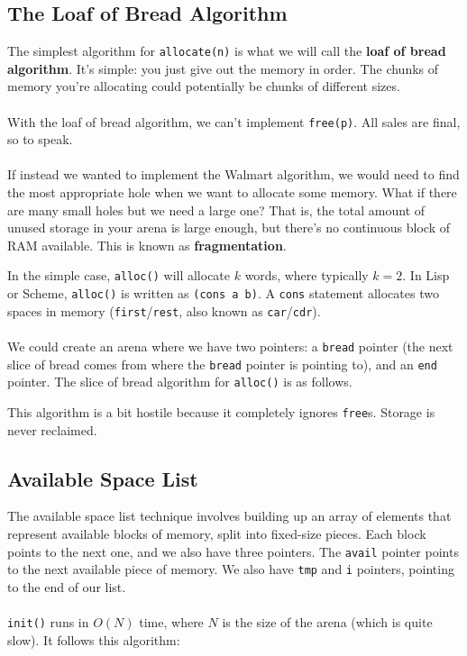 \documentclass[]{article}
\theoremstyle{definition}
\newcommand{\lecture}[1]{\marginpar{{\footnotesize $\leftarrow$ \underline{#1}}}}
\begin{document}
		\subsection{The Loaf of Bread Algorithm}
			The simplest algorithm for \verb+allocate(n)+ is what we will call the \textbf{loaf of bread algorithm}. It's simple: you just give out the memory in order. The chunks of memory you're allocating could potentially be chunks of different sizes.
			\\ \\
			With the loaf of bread algorithm, we can't implement \verb+free(p)+. All sales are final, so to speak.
			\\ \\
			If instead we wanted to implement the Walmart algorithm, we would need to find the most appropriate hole when we want to allocate some memory. What if there are many small holes but we need a large one? That is, the total amount of unused storage in your arena is large enough, but there's no continuous block of RAM available. This is known as \textbf{fragmentation}. \lecture{March 27, 2013}
		
			In the simple case, \verb+alloc()+ will allocate $k$ words, where typically $k = 2$. In Lisp or Scheme, \verb+alloc()+ is written as \verb+(cons a b)+. A \verb+cons+ statement allocates two spaces in memory (\verb+first+/\verb+rest+, also known as \verb+car+/\verb+cdr+).
			\\ \\
			We could create an arena where we have two pointers: a \verb+bread+ pointer (the next slice of bread comes from where the \verb+bread+ pointer is pointing to), and an \verb+end+ pointer. The slice of bread algorithm for \verb+alloc()+ is as follows.

			\begin{algorithm}[H]
			\end{algorithm}

			This algorithm is a bit hostile because it completely ignores \verb+free+s. Storage is never reclaimed.
		
		\subsection{Available Space List}
			The available space list technique involves building up an array of elements that represent available blocks of memory, split into fixed-size pieces. Each block points to the next one, and we also have three pointers. The \verb+avail+ pointer points to the next available piece of memory. We also have \verb+tmp+ and \verb+i+ pointers, pointing to the end of our list.
			\\ \\
			\verb+init()+ runs in $O(N)$ time, where $N$ is the size of the arena (which is quite slow). It follows this algorithm:
\end{document}
